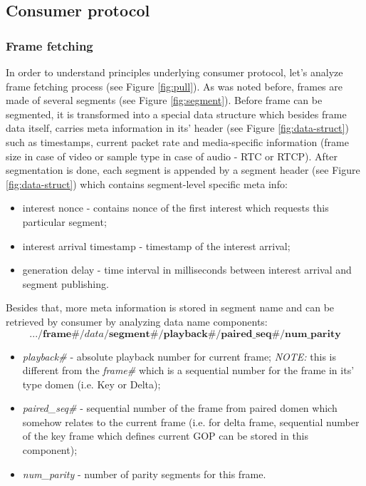 \documentclass[10pt]{proc}
\begin{document}
\subsection{Consumer protocol}

\subsubsection{Frame fetching}

In order to understand principles underlying consumer protocol, let's analyze frame fetching process (see Figure \ref{fig:pull}). As was noted before, frames are made of several segments (see Figure \ref{fig:segment}). Before frame can be segmented, it is transformed into a special data structure which besides frame data itself, carries meta information in its' header (see Figure \ref{fig:data-struct}) such as timestamps, current packet rate and media-specific information (frame size in case of video or sample type in case of audio - RTC or RTCP). After segmentation is done, each segment is appended by a segment header (see Figure \ref{fig:data-struct}) which contains segment-level specific meta info: 
\begin{itemize}
\item interest nonce - contains nonce of the first interest which requests this particular segment;
\item interest arrival timestamp - timestamp of the interest arrival;
\item generation delay - time interval in milliseconds between interest arrival and segment publishing.
\end{itemize}
Besides that, more meta information is stored in segment name and can be retrieved by consumer by analyzing data name components:
\tiny\begin{equation}
.../\textbf{frame\#}/data/\textbf{segment\#}/\textbf{playback\#}/\textbf{paired\_seq\#}/\textbf{num\_parity} \nonumber
\end{equation}\normalsize
\begin{itemize}
\item \textit{playback\#} - absolute playback number for current frame; \textit{NOTE:} this is different from the \textit{frame\#} which is a sequential number for the frame in its' type domen (i.e. Key or Delta);
\item \textit{paired\_seq\#} - sequential number of the frame from paired domen which somehow relates to the current frame (i.e. for delta frame, sequential number of the key frame which defines current GOP can be stored in this component);
\item \textit{num\_parity} - number of parity segments for this frame.
\end{itemize}
\end{document}
